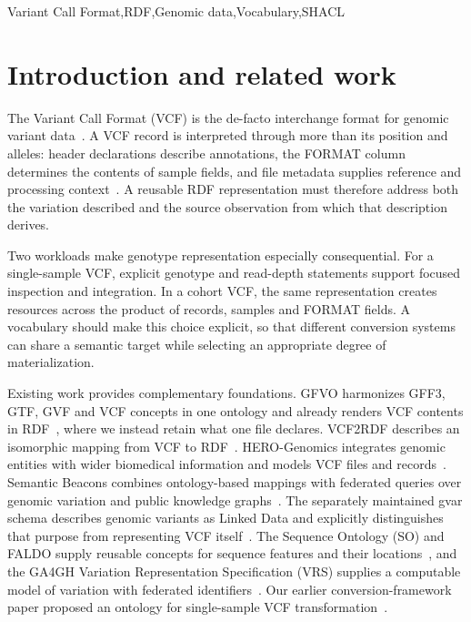 \documentclass{ceurart}
\begin{document}
\begin{keywords}
Variant Call Format\sep RDF\sep Genomic data\sep Vocabulary\sep SHACL
\end{keywords}
\maketitle

\section{Introduction and related work}

The Variant Call Format (VCF) is the de-facto interchange format for genomic variant data~\cite{danecek2011vcf}. A VCF record is interpreted through more than its position and alleles: header declarations describe annotations, the FORMAT column determines the contents of sample fields, and file metadata supplies reference and processing context~\cite{vcf45}. A reusable RDF representation must therefore address both the variation described and the source observation from which that description derives.

Two workloads make genotype representation especially consequential. For a single-sample VCF, explicit genotype and read-depth statements support focused inspection and integration. In a cohort VCF, the same representation creates resources across the product of records, samples and FORMAT fields. A vocabulary should make this choice explicit, so that different conversion systems can share a semantic target while selecting an appropriate degree of materialization.

Existing work provides complementary foundations. GFVO harmonizes GFF3, GTF, GVF and VCF concepts in one ontology and already renders VCF contents in RDF~\cite{baran2015gfvo}, where we instead retain what one file declares. VCF2RDF describes an isomorphic mapping from VCF to RDF~\cite{penha2017vcf2rdf}. HERO-Genomics integrates genomic entities with wider biomedical information and models VCF files and records~\cite{cazzaro2025hero}. Semantic Beacons combines ontology-based mappings with federated queries over genomic variation and public knowledge graphs~\cite{bodrug2025semantic}. The separately maintained gvar schema describes genomic variants as Linked Data and explicitly distinguishes that purpose from representing VCF itself~\cite{gvar}. The Sequence Ontology (SO) and FALDO supply reusable concepts for sequence features and their locations~\cite{eilbeck2005so,bolleman2016faldo}, and the GA4GH Variation Representation Specification (VRS) supplies a computable model of variation with federated identifiers~\cite{wagner2021vrs}. Our earlier conversion-framework paper proposed an ontology for single-sample VCF transformation~\cite{crum2025semantifying}.
\end{document}
